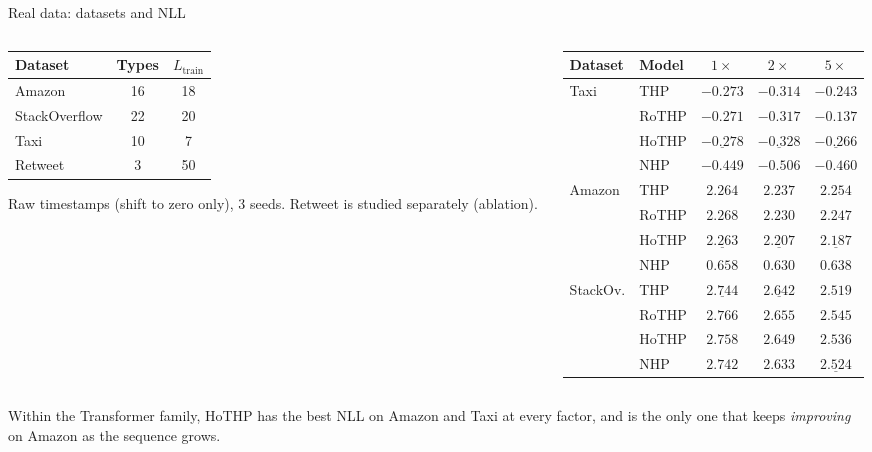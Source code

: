 \documentclass[aspectratio=169]{beamer}
\begin{document}
\begin{frame}{Real data: datasets and NLL}
  \begin{columns}[T]
    \begin{column}{0.36\textwidth}
      {\scriptsize
      \begin{tabular}{lcc}
        \toprule
        Dataset & Types & $L_{\text{train}}$ \\
        \midrule
        Amazon        & 16 & 18 \\
        StackOverflow & 22 & 20 \\
        Taxi          & 10 & 7  \\
        Retweet       & 3  & 50 \\
        \bottomrule
      \end{tabular}}
      \vspace{0.6em}

      {\scriptsize Raw timestamps (shift to zero only), 3 seeds. Retweet is
      studied separately (ablation).}
    \end{column}
    \begin{column}{0.62\textwidth}
      {\scriptsize
      \begin{tabular}{llccc}
        \toprule
        Dataset & Model & $1\times$ & $2\times$ & $5\times$ \\
        \midrule
        \multirow{4}{*}{Taxi}
          & THP   & $-0.273$ & $-0.314$ & $-0.243$ \\
          & RoTHP & $-0.271$ & $-0.317$ & $-0.137$ \\
          & HoTHP & $\underline{-0.278}$ & $\underline{-0.328}$ & $\underline{-0.266}$ \\
          & NHP   & $\mathbf{-0.449}$ & $\mathbf{-0.506}$ & $\mathbf{-0.460}$ \\
        \midrule
        \multirow{4}{*}{Amazon}
          & THP   & $2.264$ & $2.237$ & $2.254$ \\
          & RoTHP & $2.268$ & $2.230$ & $2.247$ \\
          & HoTHP & $\underline{2.263}$ & $\underline{2.207}$ & $\underline{2.187}$ \\
          & NHP   & $\mathbf{0.658}$ & $\mathbf{0.630}$ & $\mathbf{0.638}$ \\
        \midrule
        \multirow{4}{*}{StackOv.}
          & THP   & $\underline{2.744}$ & $\underline{2.642}$ & $\mathbf{2.519}$ \\
          & RoTHP & $2.766$ & $2.655$ & $2.545$ \\
          & HoTHP & $2.758$ & $2.649$ & $2.536$ \\
          & NHP   & $\mathbf{2.742}$ & $\mathbf{2.633}$ & $\underline{2.524}$ \\
        \bottomrule
      \end{tabular}}
    \end{column}
  \end{columns}
  \vspace{0.3em}
  {\small Within the Transformer family, HoTHP has the best NLL on Amazon and Taxi
  at every factor, and is the only one that keeps \emph{improving} on Amazon as the
  sequence grows.}
\end{frame}
\end{document}
